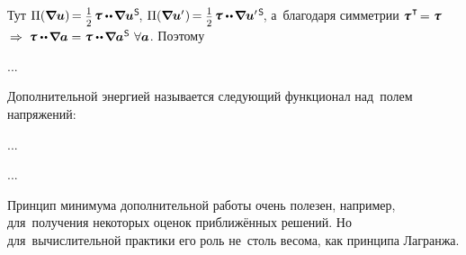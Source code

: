 \begin{otherlanguage}{russian}
\vspace{-0.36em} \noindent Тут
${\Pi(\boldnabla \bm{u}) \hspace{-0.24ex} = \smalldisplaystyleonehalf \hspace{.2ex} \mathboldtau \dotdotp \hspace{-0.2ex} \boldnabla \bm{u}^{\hspace{.08ex}\mathsf{S}}\hspace{-0.32ex}}$,
${\Pi(\boldnabla \bm{u}'\hspace{.1ex}) \hspace{-0.24ex} = \smalldisplaystyleonehalf \hspace{.2ex} \mathboldtau \dotdotp \hspace{-0.2ex} \boldnabla \bm{u}'^{\hspace{.25ex}\mathsf{S}}\hspace{-0.32ex}}$,
а~благодаря симметрии %
${\mathboldtau^{\hspace{.12ex}\T} \hspace{-0.32ex} = \mathboldtau}$ ${\hspace{.4ex}\Rightarrow\hspace{.2ex}}$ ${\mathboldtau \dotdotp \hspace{-0.2ex} \boldnabla \bm{a} = \mathboldtau \dotdotp \hspace{-0.2ex} \boldnabla \bm{a}^{\hspace{.08ex}\mathsf{S}} \hspace{.8ex}\forall \bm{a}}$. Поэтому

\nopagebreak ...




\end{otherlanguage}



\begin{otherlanguage}{russian}

Дополнительной энергией называется следующий функционал над~полем напряжений:

...



...

Принцип минимума дополнительной работы очень полезен, например, для~получения некоторых оценок приближённых решений. Но для~вычислительной практики его роль не~столь весома, как принципа Лагранжа.

\end{otherlanguage}

